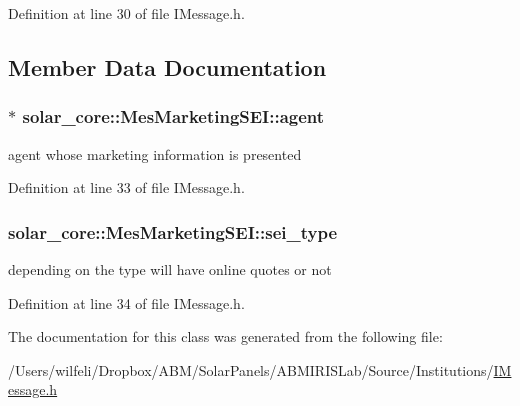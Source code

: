 Definition at line 30 of file I\+Message.\+h.



\subsection{Member Data Documentation}
\hypertarget{classsolar__core_1_1_mes_marketing_s_e_i_a5bc5eb8bf309e6ba96cfdc0feb01baa9}{}
\subsubsection[{agent}]{$\ast$ solar\+\_\+core\+::\+Mes\+Marketing\+S\+E\+I\+::agent}\label{classsolar__core_1_1_mes_marketing_s_e_i_a5bc5eb8bf309e6ba96cfdc0feb01baa9}
agent whose marketing information is presented 

Definition at line 33 of file I\+Message.\+h.

\hypertarget{classsolar__core_1_1_mes_marketing_s_e_i_a8897df83278137d8ff4b04c068e4370e}{}
\subsubsection[{sei\+\_\+type}]{ solar\+\_\+core\+::\+Mes\+Marketing\+S\+E\+I\+::sei\+\_\+type}\label{classsolar__core_1_1_mes_marketing_s_e_i_a8897df83278137d8ff4b04c068e4370e}
depending on the type will have online quotes or not 

Definition at line 34 of file I\+Message.\+h.



The documentation for this class was generated from the following file\+:\begin{DoxyCompactItemize}
\item 
/\+Users/wilfeli/\+Dropbox/\+A\+B\+M/\+Solar\+Panels/\+A\+B\+M\+I\+R\+I\+S\+Lab/\+Source/\+Institutions/\hyperlink{_i_message_8h}{I\+Message.\+h}\end{DoxyCompactItemize}
